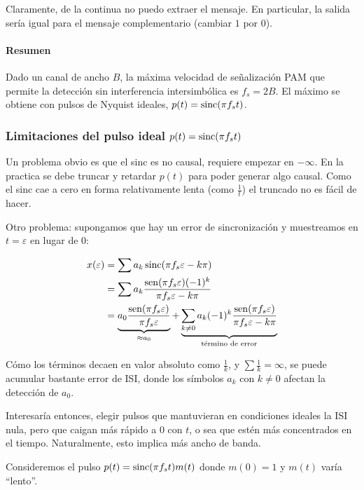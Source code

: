  Claramente, de la continua no puedo
extraer el mensaje. En particular, la salida sería igual para el
mensaje complementario (cambiar $1$ por $0$).

\paragraph{Resumen} Dado un canal de ancho $B$, la
máxima velocidad de señalización PAM que permite la detección sin
interferencia intersimbólica es $f_s=2B$. El máximo se obtiene con
pulsos de Nyquist ideales, $p(t)=\operatorname{sinc} (\pi f_s t)$.

\subsubsection*{Limitaciones del pulso ideal $p(t)=\operatorname{sinc} (\pi f_s t)$}

Un problema obvio es que el sinc es no causal, requiere empezar en
$-\infty$. En la practica se debe truncar y retardar $p(t)$ para
poder generar algo causal. Como el sinc cae a cero en forma
relativamente lenta (como $\frac{1}{t}$) el truncado no es fácil
de hacer.

Otro problema: supongamos que hay un error de sincronización y
muestreamos en $t=\varepsilon$ en lugar de $0$:

\begin{align*}
    x(\varepsilon)  & = \sum a_k \operatorname{sinc} (\pi f_s \varepsilon - k\pi)\\
            & = \sum a_k \frac{\operatorname{sen}(\pi f_s \varepsilon) (-1)^k}{\pi f_s\varepsilon -k\pi}\\
            & = \underbrace{a_0 \frac{\operatorname{sen}(\pi f_s \varepsilon)}{\pi f_s \varepsilon}}_{\approx a_0} + \underbrace{\sum_{k\neq 0} a_k (-1)^k \frac{\operatorname{sen}(\pi f_s \varepsilon)}{\pi f_s \varepsilon - k \pi}}_{\text{término de error}}
\end{align*}

Cómo los términos decaen en valor absoluto como $\frac{1}{k}$, y
$\sum \frac{1}{k}=\infty$, se puede acumular bastante error de
ISI, donde los símbolos $a_k$ con $k\neq 0$ afectan la detección
de $a_0$.

Interesaría entonces, elegir pulsos que mantuvieran en condiciones
ideales la ISI nula, pero que caigan más rápido a $0$ con $t$, o
sea que estén más concentrados en el tiempo. Naturalmente, esto
implica más ancho de banda.

Consideremos el pulso $p(t) = \operatorname{sinc} (\pi f_s t) m(t)$ donde
$m(0)=1$ y $m(t)$ varía ``lento''.

